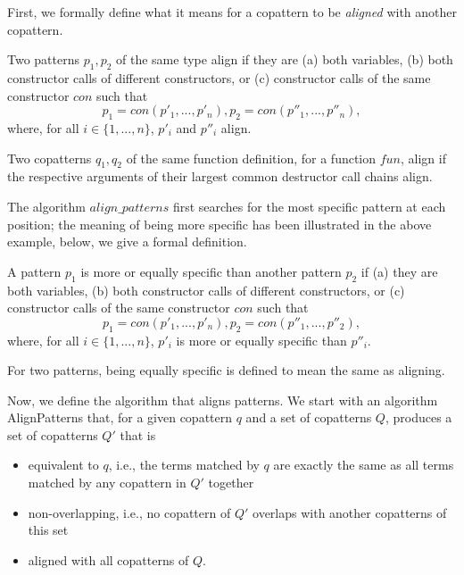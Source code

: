 First, we formally define what it means for a copattern to be \textit{aligned} with another copattern.

\begin{definition}
Two patterns $p_1, p_2$ of the same type align if they are (a) both variables, (b) both constructor calls of different constructors, or (c) constructor calls of the same constructor $con$ such that
\[
p_1 = con(p'_1, ..., p'_n), p_2 = con(p''_1, ..., p''_n),
\]
where, for all $i \in \{1, ..., n\}$, $p'_i$ and $p''_i$ align.
\end{definition}

\begin{definition}
Two copatterns $q_1, q_2$ of the same function definition, for a function $fun$, align if the respective arguments of their largest common destructor call chains align.
\end{definition}

The algorithm $align\_patterns$ first searches for the most specific pattern at each position; the meaning of being more specific has been illustrated in the above example, below, we give a formal definition.

\begin{definition}
A pattern $p_1$ is more or equally specific than another pattern $p_2$ if (a) they are both variables, (b) both constructor calls of different constructors, or (c) constructor calls of the same constructor $con$ such that
\[
p_1 = con(p'_1, ..., p'_n), p_2 = con(p''_1, ..., p''_2),
\]
where, for all $i \in \{1, ..., n\}$, $p'_i$ is more or equally specific than $p''_i$.
\end{definition}

For two patterns, being equally specific is defined to mean the same as aligning.

Now, we define the algorithm that aligns patterns. We start with an algorithm \textsf{AlignPatterns} that, for a given copattern $q$ and a set of copatterns $Q$, produces a set of copatterns $Q'$ that is
\begin{itemize}
\item equivalent to $q$, i.e., the terms matched by $q$ are exactly the same as all terms matched by any copattern in $Q'$ together
\item non-overlapping, i.e., no copattern of $Q'$ overlaps with another copatterns of this set
\item aligned with all copatterns of $Q$.
\end{itemize}

